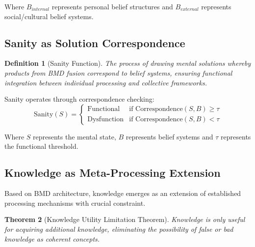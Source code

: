 \documentclass[12pt,a4paper]{article}
\newtheorem{theorem}{Theorem}[section]
\newtheorem{definition}[theorem]{Definition}
\begin{document}
Where $B_{internal}$ represents personal belief structures and $B_{external}$ represents social/cultural belief systems.

\subsection{Sanity as Solution Correspondence}

\begin{definition}[Sanity Function]
The process of drawing mental solutions whereby products from BMD fusion correspond to belief systems, ensuring functional integration between individual processing and collective frameworks.
\end{definition}

Sanity operates through correspondence checking:
\begin{equation}
\text{Sanity}(S) = \begin{cases} 
\text{Functional} & \text{if } \text{Correspondence}(S, B) \geq \tau \\
\text{Dysfunction} & \text{if } \text{Correspondence}(S, B) < \tau
\end{cases}
\end{equation}

Where $S$ represents the mental state, $B$ represents belief systems and $\tau$ represents the functional threshold.

\subsection{Knowledge as Meta-Processing Extension}

Based on BMD architecture, knowledge emerges as an extension of established processing mechanisms with crucial constraint.

\begin{theorem}[Knowledge Utility Limitation Theorem]
Knowledge is only useful for acquiring additional knowledge, eliminating the possibility of false or bad knowledge as coherent concepts.
\end{theorem}
\end{document}

